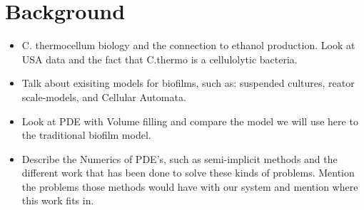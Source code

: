 \section{Background}

\begin{itemize}
  \item C. thermocellum biology and the connection to ethanol production. Look at USA data and the fact that C.thermo is a cellulolytic bacteria. 
  \item Talk about exisiting models for biofilms, such as: suspended cultures, reator scale-models, and Cellular Automata. %
  \item Look at PDE with Volume filling and compare the model we will use here to the traditional biofilm model.
  \item Describe the Numerics of PDE's, such as semi-implicit methods and the different work that has been done to solve these kinds of problems. Mention the problems those methods would have with our system and mention where this work fits in. %
\end{itemize}
